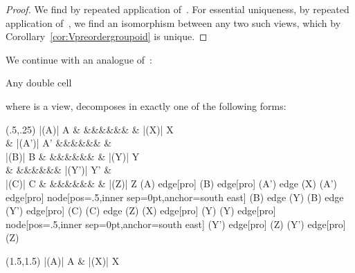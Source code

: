 \documentclass{LMCS}
\theoremstyle{plain}\newtheorem{satz}[thm]{Satz}
\begin{document}
\begin{proof}
  We find  by repeated application of~.  For
  essential uniqueness, by repeated application of~, 
  we find an isomorphism between any two such views, which 
  by Corollary~\ref{cor:Vpreordergroupoid} is unique.
\end{proof}


We continue with an analogue of~:
\begin{prop}\label{prop:views:decomp}
  Any double cell
  \begin{center}
  \end{center}
where  is a view, decomposes in exactly one of the following forms:
  \begin{center}
    \begin{minipage}[t]{0.35\linewidth}
      \centering \Diag (.5,.25) {     }{|(A)| A \& \&\&\&\&\&\& \& |(X)| X \\
        \& |(A')| A' \&\&\&\&\&\& \&  \\
        |(B)| B \& \&\&\&\&\&\& \& |(Y)| Y \\
        \& \&\&\&\&\&\& |(Y')| Y' \&  \\
        |(C)| C \& \&\&\&\&\&\& \& |(Z)| Z }{(A) edge[pro] (B) edge[pro] (A') edge (X) (A') edge[pro] node[pos=.5,inner sep=0pt,anchor=south east]
        {} (B) edge (Y) (B) edge (Y') edge[pro] (C) (C) edge (Z) (X) edge[pro] (Y) (Y) edge[pro] node[pos=.5,inner sep=0pt,anchor=south east]
        {} (Y') edge[pro] (Z) (Y') edge[pro] (Z) } 
    \end{minipage}
    \hfil
    \begin{minipage}[t]{0.25\linewidth}
      \centering
      \Diag (1.5,1.5) {  }{|(A)| A \& |(X)| X \\
}
\end{minipage}
\end{center}
\end{prop}
\end{document}
